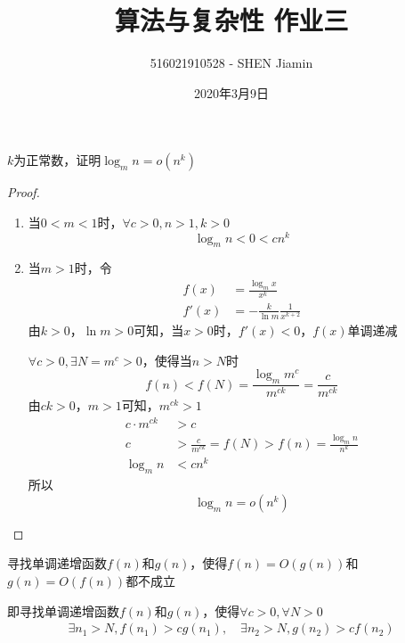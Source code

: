 \documentclass[answers]{exam}
\title{算法与复杂性 \quad 作业三}
\author{516021910528 - SHEN Jiamin}
\date{2020年3月9日}
\begin{document}
\maketitle

\begin{questions}

    \question $k$为正常数，证明$\log_m{n} = o(n^k)$

    \begin{solution}
        \begin{proof}
            \begin{enumerate}
                \item 当$0 < m < 1$时，$\forall c > 0, n > 1, k > 0$ $$
                          \log_m{n} < 0 < c n^k
                      $$
                \item 当$m > 1$时，令\begin{align*}
                          f(x)  & = \frac{\log_m{x}}{x^k}             \\
                          f'(x) & = -\frac{k}{\ln m}\frac{1}{x^{k+2}}
                      \end{align*}
                      由$k>0$，$\ln m>0$可知，当$x>0$时，$f'(x) < 0$，$f(x)$单调递减

                      $\forall c > 0, \exists N = m^c > 0$，使得当$n > N$时 $$
                          f(n) < f(N) =\frac{\log_m{m^c}}{m^{ck}} = \frac{c}{m^{ck}}
                      $$
                      由$ck>0$，$m>1$可知，$m^{ck} > 1$
                      \begin{align*}
                          c \cdot m^{ck} & > c                                                      \\
                          c              & > \frac{c}{m^{ck}} = f(N) > f(n) = \frac{\log_m{n}}{n^k} \\
                          \log_m{n}      & < c n^k
                      \end{align*}
                      所以$$\log_m{n} = o(n^k)$$
            \end{enumerate}
        \end{proof}
    \end{solution}

    \newpage

    \question 寻找单调递增函数$f(n)$和$g(n)$，使得$f(n)=O(g(n))$和$g(n)=O(f(n))$都不成立

    \begin{solution}
        即寻找单调递增函数$f(n)$和$g(n)$，使得$\forall c > 0, \forall N > 0$ \begin{align*}
            \exists n_1 > N, f(n_1) > c g(n_1) , \quad
            \exists n_2 > N, g(n_2) > c f(n_2)
        \end{align*}


\end{solution}
\end{questions}
\end{document}
